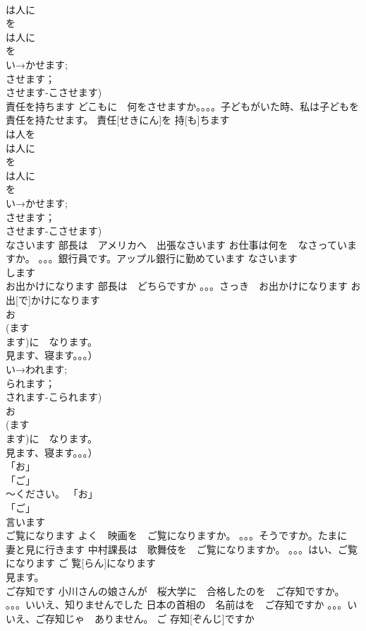 \documentclass[8pt]{extreport}
\begin{document}
\begin{CJK}{UTF8}{min}
\\	は人に
\\	を
\\	は人に
\\	を
\\	い→かせます;
\\	させます；
\\	させます-こさせます)
\\	責任を持ちます	どこもに　何をさせますか。。。。子どもがいた時、私は子どもを　責任を持たせます。	責任[せきにん]を 持[も]ちます			
\\	は人を
\\	は人に
\\	を
\\	は人に
\\	を
\\	い→かせます;
\\	させます；
\\	させます-こさせます)
\\	なさいます	部長は　アメリカへ　出張なさいます お仕事は何を　なさっていますか。 。。。銀行員です。アップル銀行に勤めています	なさいます				
\\	します
\\	お出かけになります	部長は　どちらですか 。。。さっき　お出かけになります	お 出[で]かけになります			
\\	お
\\	(ます
\\	ます)に　なります。
\\	見ます、寝ます。。。）		
\\	い→われます;
\\	られます；
\\	されます-こられます)	
\\	お
\\	(ます
\\	ます)に　なります。
\\	見ます、寝ます。。。） 
\\	「お」
\\	「ご」
\\	～ください。 「お」
\\	「ご」
\\	言います
\\	ご覧になります	よく　映画を　ご覧になりますか。 。。。そうですか。たまに　妻と見に行きます 中村課長は　歌舞伎を　ご覧になりますか。 。。。はい、ご覧になります	ご 覧[らん]になります			
\\	見ます。
\\	ご存知です	小川さんの娘さんが　桜大学に　合格したのを　ご存知ですか。 。。。いいえ、知りませんでした 日本の首相の　名前はを　ご存知ですか 。。。いいえ、ご存知じゃ　ありません。	ご 存知[ぞんじ]ですか			

\end{CJK}
\end{document}
